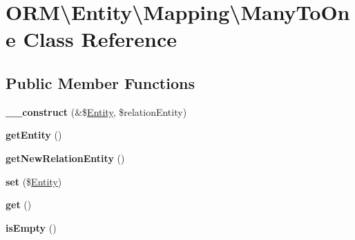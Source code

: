 \hypertarget{classORM_1_1Entity_1_1Mapping_1_1ManyToOne}{}\section{O\+RM\textbackslash{}Entity\textbackslash{}Mapping\textbackslash{}Many\+To\+One Class Reference}
\label{classORM_1_1Entity_1_1Mapping_1_1ManyToOne}
\subsection*{Public Member Functions}
\begin{DoxyCompactItemize}
\item 
{\bfseries \+\_\+\+\_\+construct} (\&\$\hyperlink{classORM_1_1Entity_1_1Entity}{Entity}, \$relation\+Entity)\hypertarget{classORM_1_1Entity_1_1Mapping_1_1ManyToOne_af74e5bd7db3206cd1ee6db1c2b15e66c}{}\label{classORM_1_1Entity_1_1Mapping_1_1ManyToOne_af74e5bd7db3206cd1ee6db1c2b15e66c}

\item 
{\bfseries get\+Entity} ()\hypertarget{classORM_1_1Entity_1_1Mapping_1_1ManyToOne_ad665ef90a1a8564723d6d6ad75b1ad33}{}\label{classORM_1_1Entity_1_1Mapping_1_1ManyToOne_ad665ef90a1a8564723d6d6ad75b1ad33}

\item 
{\bfseries get\+New\+Relation\+Entity} ()\hypertarget{classORM_1_1Entity_1_1Mapping_1_1ManyToOne_aa5a67b9244dd29bb095013c0aa5090c9}{}\label{classORM_1_1Entity_1_1Mapping_1_1ManyToOne_aa5a67b9244dd29bb095013c0aa5090c9}

\item 
{\bfseries set} (\$\hyperlink{classORM_1_1Entity_1_1Entity}{Entity})\hypertarget{classORM_1_1Entity_1_1Mapping_1_1ManyToOne_af3cad036354899307d6b0d3dc6ea943d}{}\label{classORM_1_1Entity_1_1Mapping_1_1ManyToOne_af3cad036354899307d6b0d3dc6ea943d}

\item 
{\bfseries get} ()\hypertarget{classORM_1_1Entity_1_1Mapping_1_1ManyToOne_a00f86301298aa86567c5b99032748f64}{}\label{classORM_1_1Entity_1_1Mapping_1_1ManyToOne_a00f86301298aa86567c5b99032748f64}

\item 
{\bfseries is\+Empty} ()\hypertarget{classORM_1_1Entity_1_1Mapping_1_1ManyToOne_a6c12f9ea6517afc325632f1c132c3d17}{}\label{classORM_1_1Entity_1_1Mapping_1_1ManyToOne_a6c12f9ea6517afc325632f1c132c3d17}

\end{DoxyCompactItemize}
